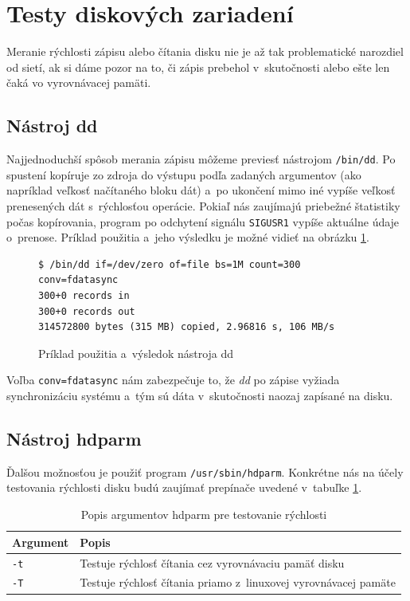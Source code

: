\section{Testy diskových zariadení}

Meranie rýchlosti zápisu alebo čítania disku nie je až tak problematické
narozdiel od sietí, ak si dáme pozor na to, či zápis prebehol v~skutočnosti
alebo ešte len čaká vo vyrovnávacej pamäti.

%
%

\subsection*{Nástroj dd}

Najjednoduchší spôsob merania zápisu môžeme previesť nástrojom
\texttt{/bin/dd}. Po spustení kopíruje zo zdroja do výstupu podľa zadaných
argumentov (ako napríklad veľkosť načítaného bloku dát) a~po ukončení mimo iné
vypíše veľkosť prenesených dát s~rýchlosťou operácie. Pokiaľ nás zaujímajú
priebežné štatistiky počas kopírovania, program po odchytení signálu
\texttt{SIGUSR1} vypíše aktuálne údaje o~prenose.  Príklad použitia a~jeho
výsledku je možné vidieť na obrázku \ref{alg:dd-usage}.

\begin{figure}[H]
\begin{lstlisting}
$ /bin/dd if=/dev/zero of=file bs=1M count=300 conv=fdatasync
300+0 records in
300+0 records out
314572800 bytes (315 MB) copied, 2.96816 s, 106 MB/s
\end{lstlisting}
\caption{Príklad použitia a~výsledok nástroja dd}
\label{alg:dd-usage}
\end{figure}

Voľba \texttt{conv=fdatasync} nám zabezpečuje to, že \emph{dd} po zápise
vyžiada synchronizáciu systému a~tým sú dáta v~skutočnosti naozaj zapísané na
disku.

%
%

\subsection*{Nástroj hdparm}

Ďalšou možnosťou je použiť program \texttt{/usr/sbin/hdparm}. Konkrétne nás na
účely testovania rýchlosti disku budú zaujímať prepínače uvedené v~tabuľke
\ref{tab:hdparm-args}.

\begin{table}[H]
\begin{center}
\begin{tabular}{|l|l|}
    \hline
    \textbf{Argument} & \textbf{Popis} \\
    \hline
    \texttt{-t}  & Testuje rýchlosť čítania cez vyrovnávaciu pamäť disku \\
    \texttt{-T}  & Testuje rýchlosť čítania priamo z~linuxovej vyrovnávacej pamäte \\
    \hline
\end{tabular}
\caption{Popis argumentov hdparm pre testovanie rýchlosti}
\label{tab:hdparm-args}
\end{center}
\end{table}

